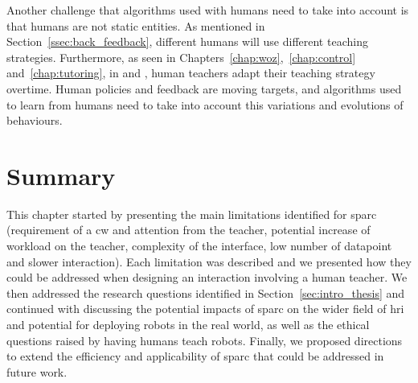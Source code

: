Another challenge that algorithms used with humans need to take into account is that humans are not static entities. As mentioned in Section~\ref{ssec:back_feedback}, different humans will use different teaching strategies. Furthermore, as seen in Chapters~\ref{chap:woz},~\ref{chap:control} and~\ref{chap:tutoring}, in \cite{thomaz2008teachable} and \cite{macglashan2017interactive}, human teachers adapt their teaching strategy overtime. Human policies and feedback are moving targets, and algorithms used to learn from humans need to take into account this variations and evolutions of behaviours.

\section{Summary} \label{sec:disc_summary}


This chapter started by presenting the main limitations identified for \gls{sparc} (requirement of a \gls{cw} and attention from the teacher, potential increase of workload on the teacher, complexity of the interface, low number of datapoint and slower interaction). Each limitation was described and we presented how they could be addressed when designing an interaction involving a human teacher. We then addressed the research questions identified in Section~\ref{sec:intro_thesis} and continued with discussing the potential impacts of \gls{sparc} on the wider field of \gls{hri} and potential for deploying robots in the real world, as well as the ethical questions raised by having humans teach robots. Finally, we proposed directions to extend the efficiency and applicability of \gls{sparc} that could be addressed in future work.
